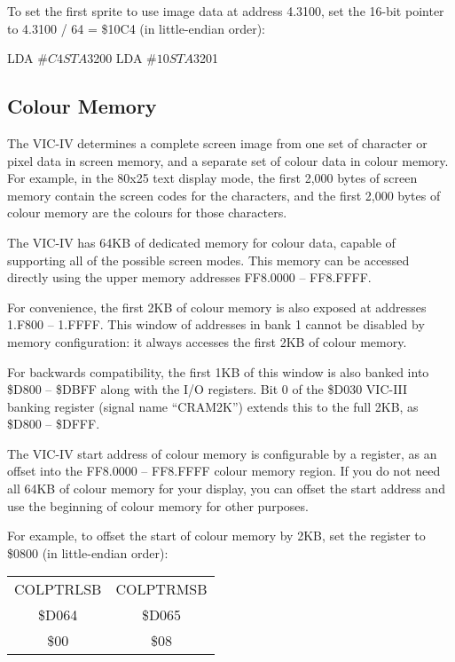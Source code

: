 To set the first sprite to use image data at address 4.3100, set the 16-bit pointer to 4.3100 / 64 = \$10C4 (in little-endian order):

\begin{asmcode}
LDA #$C4
STA $3200
LDA #$10
STA $3201
\end{asmcode}

\subsection{Colour Memory}

The VIC-IV determines a complete screen image from one set of character or pixel data in screen memory, and a separate set of colour data in colour memory. For example, in the 80x25 text display mode, the first 2,000 bytes of screen memory contain the screen codes for the characters, and the first 2,000 bytes of colour memory are the colours for those characters.

The VIC-IV has 64KB of dedicated memory for colour data, capable of supporting all of the possible screen modes. This memory can be accessed directly using the upper memory addresses FF8.0000 -- FF8.FFFF.

For convenience, the first 2KB of colour memory is also exposed at addresses 1.F800 -- 1.FFFF. This window of addresses in bank 1 cannot be disabled by memory configuration: it always accesses the first 2KB of colour memory.

For backwards compatibility, the first 1KB of this window is also banked into \$D800 -- \$DBFF along with the I/O registers. Bit 0 of the \$D030 VIC-III banking register (signal name ``CRAM2K'') extends this to the full 2KB, as \$D800 -- \$DFFF.

The VIC-IV start address of colour memory is configurable by a register, as an offset into the FF8.0000 -- FF8.FFFF colour memory region. If you do not need all 64KB of colour memory for your display, you can offset the start address and use the beginning of colour memory for other purposes.

For example, to offset the start of colour memory by 2KB, set the register to \$0800 (in little-endian order):

\begin{center}
\begin{tabular}{|c|c|}
\hline
COLPTRLSB & COLPTRMSB \\
\$D064 & \$D065 \\
\hline
\$00 & \$08 \\
\hline
\end{tabular}
\end{center}

